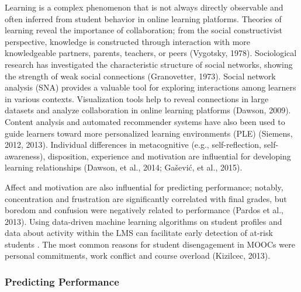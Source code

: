 \documentclass[sigconf]{acmart}
\begin{document}
Learning is a complex phenomenon that is not always directly observable and 
often inferred from student behavior in online learning platforms. Theories of 
learning reveal the importance of collaboration; from the social constructivist 
perspective, knowledge is constructed through interaction with more knowledgeable
partners, parents, teachers, or peers (Vygotsky, 1978). Sociological research
has investigated the characteristic structure of social networks, showing the 
strength of weak social connections (Granovetter, 1973). Social network analysis 
(SNA) provides a valuable tool for exploring interactions among learners in 
various contexts. Visualization tools help to reveal connections in large 
datasets and analyze collaboration in online learning platforms (Dawson, 2009). 
Content analysis and automated recommender systems have also been used to guide 
learners toward more personalized learning environments (PLE) (Siemens, 2012, 2013). 
Individual differences in metacognitive (e.g., self-reflection, self-awareness), 
disposition, experience and motivation are influential for developing learning 
relationships (Dawson, et al., 2014; Gašević, et al., 2015). 

Affect and motivation are also 
influential for predicting performance; notably, concentration and 
frustration are significantly correlated with final grades, but boredom and 
confusion were negatively related to performance (Pardos et al., 2013). 
Using data-driven machine learning algorithms on student profiles and data 
about activity within the LMS can facilitate early detection of at-risk 
students \cite{Dekkar09}.  The most 
common reasons for  student disengagement in MOOCs were personal commitments, 
work conflict and course overload (Kizilcec, 2013). 

\subsubsection{Predicting Performance} 
\end{document}
